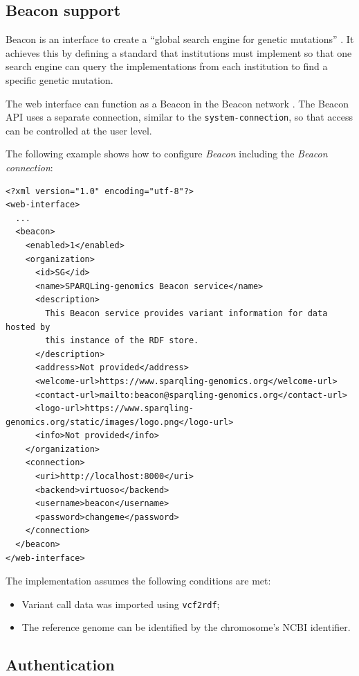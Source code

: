 \subsection{Beacon support}

  Beacon is an interface to create a ``global search engine for genetic
  mutations'' \citep{beacon-network}.  It achieves this by defining a
  standard that institutions must implement so that one search engine can
  query the implementations from each institution to find a specific
  genetic mutation.

  The web interface can function as a Beacon in the Beacon network
  \citep{beacon-network}.  The Beacon API uses a separate connection,
  similar to the \texttt{system-connection}, so that access can be
  controlled at the user level.

  The following example shows how to configure \emph{Beacon} including the
  \emph{Beacon connection}:

\begin{siderules}
\begin{verbatim}
<?xml version="1.0" encoding="utf-8"?>
<web-interface>
  ...
  <beacon>
    <enabled>1</enabled>
    <organization>
      <id>SG</id>
      <name>SPARQLing-genomics Beacon service</name>
      <description>
        This Beacon service provides variant information for data hosted by
        this instance of the RDF store.
      </description>
      <address>Not provided</address>
      <welcome-url>https://www.sparqling-genomics.org</welcome-url>
      <contact-url>mailto:beacon@sparqling-genomics.org</contact-url>
      <logo-url>https://www.sparqling-genomics.org/static/images/logo.png</logo-url>
      <info>Not provided</info>
    </organization>
    <connection>
      <uri>http://localhost:8000</uri>
      <backend>virtuoso</backend>
      <username>beacon</username>
      <password>changeme</password>
    </connection>
  </beacon>
</web-interface>
\end{verbatim}
\end{siderules}

  The implementation assumes the following conditions are met:
  \begin{itemize}
  \item Variant call data was imported using \texttt{vcf2rdf};
  \item The reference genome can be identified by the chromosome's NCBI
    identifier.
  \end{itemize}

\subsection{Authentication}
\label{sec:authentication}

